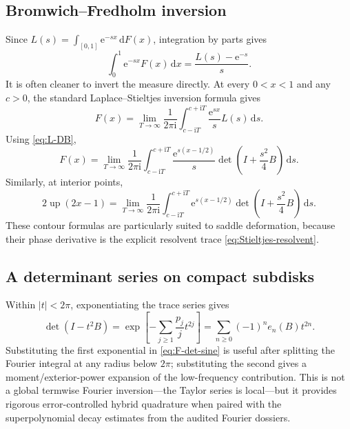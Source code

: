 \documentclass[11pt,oneside]{article}
\theoremstyle{definition}
\newcommand{\dd}{\,\mathrm d}
\newcommand{\e}{\mathrm e}
\newcommand{\ii}{\mathrm i}
\newcommand{\Up}{\operatorname{up}}
\begin{document}
\subsection{Bromwich--Fredholm inversion}

Since \(L(s)=\int_{[0,1]}\e^{-sx}\dd F(x)\), integration by parts gives
\begin{equation}
 \int_0^1\e^{-sx}F(x)\dd x=\frac{L(s)-\e^{-s}}s.
 \label{eq:Laplace-CDF}
\end{equation}
It is often cleaner to invert the measure directly.  At every \(0<x<1\) and any
\(c>0\), the standard Laplace--Stieltjes inversion formula gives
\begin{equation}
 F(x)=\lim_{T\to\infty}\frac1{2\pi\ii}
 \int_{c-\ii T}^{c+\ii T}\frac{\e^{sx}}sL(s)\dd s.
 \label{eq:Bromwich-F}
\end{equation}
Using \eqref{eq:L-DB},
\begin{equation}
 \boxed{\quad
 F(x)=\lim_{T\to\infty}\frac1{2\pi\ii}
 \int_{c-\ii T}^{c+\ii T}
 \frac{\e^{s(x-1/2)}}s\det\!\left(I+\frac{s^2}{4}B\right)\dd s.
 \quad}
 \label{eq:Bromwich-Fredholm-F}
\end{equation}
Similarly, at interior points,
\begin{equation}
 2\Up(2x-1)=\lim_{T\to\infty}\frac1{2\pi\ii}
 \int_{c-\ii T}^{c+\ii T}
 \e^{s(x-1/2)}\det\!\left(I+\frac{s^2}{4}B\right)\dd s.
 \label{eq:Bromwich-up}
\end{equation}
These contour formulas are particularly suited to saddle deformation, because their
phase derivative is the explicit resolvent trace \eqref{eq:Stieltjes-resolvent}.

\subsection{A determinant series on compact subdisks}

Within \(|t|<2\pi\), exponentiating the trace series gives
\begin{equation}
 \det(I-t^2B)=
 \exp\!\left[-\sum_{j\ge1}\frac{p_j}{j}t^{2j}\right]
 =\sum_{n\ge0}(-1)^ne_n(B)t^{2n}.
 \label{eq:det-local-series}
\end{equation}
Substituting the first exponential in \eqref{eq:F-det-sine} is useful after splitting
the Fourier integral at any radius below \(2\pi\); substituting the second gives a
moment/exterior-power expansion of the low-frequency contribution.  This is not a
global termwise Fourier inversion---the Taylor series is local---but it provides
rigorous error-controlled hybrid quadrature when paired with the superpolynomial
decay estimates from the audited Fourier dossiers.
\end{document}
